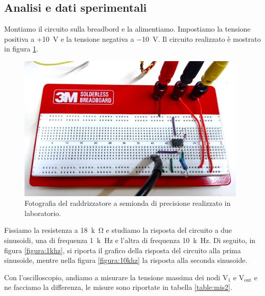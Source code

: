 \documentclass{report}
\begin{document}
\subsection{Analisi e dati sperimentali}
Montiamo il circuito sulla breadbord e la alimentiamo. Impostiamo la tensione positiva a +\SI{10}{\volt} e la tensione negativa a \SI{-10}{\volt}. Il circuito realizzato è mostrato in figura \ref{figura:circ2}. \par
\begin{figure}[h!]
	\centering
	\includegraphics[height=7cm]{immagini/circuito2}
	\caption{Fotografia del raddrizzatore a semionda di precisione realizzato in laboratorio.}
	\label{figura:circ2}
\end{figure}
Fissiamo la resistenza a \SI{18}{k\ohm} e studiamo la risposta del circuito a due sinusoidi, una di frequenza \SI{1}{k\hertz} e l'altra di frequenza \SI{10}{k\hertz}. Di seguito, in figura \ref{figura:1khz}, si riporta il grafico della risposta del circuito alla prima sinusoide, mentre nella figura \ref{figura:10khz} la risposta alla seconda sinusoide. \par
Con l'oscilloscopio, andiamo a misurare la tensione massima dei nodi $\mathrm{V_1}$ e $\mathrm{V_{out}}$ e ne facciamo la differenza, le misure sono riportate in tabella \ref{table:mis2}.
\end{document}
